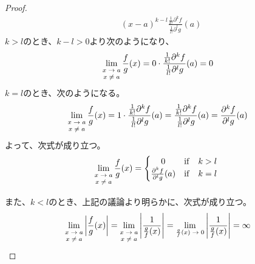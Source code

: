 \documentclass[dvipdfmx]{jsarticle}
\begin{document}
\begin{proof}
\begin{align*}
{\begin{matrix}
\end{matrix}}(x - a)^{k - l}\frac{\frac{1}{k!}\partial^{k}f}{\frac{1}{l!}\partial^{l}g}(a)
\end{align*}
$k > l$のとき、$k - l > 0$より次のようになり、
\begin{align*}
\lim_{\scriptsize \begin{matrix}
x \rightarrow a \\
x \neq a \\
\end{matrix}}{\frac{f}{g}(x)} = 0 \cdot \frac{\frac{1}{k!}\partial^{k}f}{\frac{1}{l!}\partial^{l}g}(a) = 0
\end{align*}
$k = l$のとき、次のようになる。
\begin{align*}
\lim_{\scriptsize \begin{matrix}
x \rightarrow a \\
x \neq a \\
\end{matrix}}{\frac{f}{g}(x)} = 1 \cdot \frac{\frac{1}{k!}\partial^{k}f}{\frac{1}{l!}\partial^{l}g}(a) = \frac{\frac{1}{k!}\partial^{k}f}{\frac{1}{l!}\partial^{l}g}(a) = \frac{\partial^{k}f}{\partial^{l}g}(a)
\end{align*}
よって、次式が成り立つ。
\begin{align*}
\lim_{\scriptsize \begin{matrix}
x \rightarrow a \\
x \neq a \\
\end{matrix}}{\frac{f}{g}(x)} = \left\{ \begin{matrix}
0 & \mathrm{if} & k > l \\
\frac{\partial^{k}f}{\partial^{l}g}(a) & \mathrm{if} & k = l \\
\end{matrix} \right.\ 
\end{align*}\par
また、$k < l$のとき、上記の議論より明らかに、次式が成り立つ。
\begin{align*}
\lim_{\scriptsize \begin{matrix}
x \rightarrow a \\
x \neq a \\
\end{matrix}}\left| \frac{f}{g}(x) \right| = \lim_{\scriptsize \begin{matrix}
x \rightarrow a \\
x \neq a \\
\end{matrix}}\left| \frac{1}{\frac{g}{f}(x)} \right| = \lim_{\scriptsize \begin{matrix}
\frac{g}{f}(x) \rightarrow 0 \\
\end{matrix}}\left| \frac{1}{\frac{g}{f}(x)} \right| = \infty
\end{align*}
\end{proof}
\end{document}
